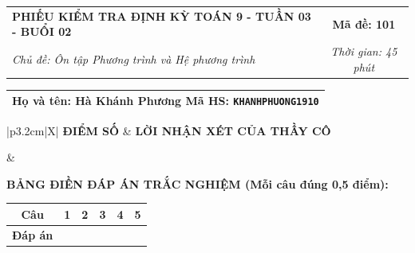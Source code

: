 \documentclass[12pt,a4paper]{article}
\begin{document}
\newpage



\noindent
\begin{tabularx}{\linewidth}{|X|c|}
\hline
\textbf{PHIẾU KIỂM TRA ĐỊNH KỲ TOÁN 9 - TUẦN 03 - BUỔI 02} & \textbf{Mã đề: 101} \\
\textit{Chủ đề: Ôn tập Phương trình và Hệ phương trình} & \textit{Thời gian: 45 phút} \\
\hline
\end{tabularx}

\vspace{1mm}

\noindent
\begin{tabularx}{\linewidth}{|X|}
\hline
\rule[-2mm]{0pt}{7.5mm}\textbf{Họ và tên:} \textbf{\large Hà Khánh Phương} \hfill \textbf{Mã HS:} \texttt{KHANHPHUONG1910} \quad \\
\hline
\end{tabularx}

\vspace{1mm}

\noindent
\begin{tabularx}{\linewidth}{|p{3.2cm}|X|}
\hline
\centering\textbf{ĐIỂM SỐ} & \centering\textbf{LỜI NHẬN XÉT CỦA THẦY CÔ} \tabularnewline
\hline
\rule{0pt}{1.3cm} & \tabularnewline
\hline
\end{tabularx}

\vspace{1.2mm}

\noindent\textbf{BẢNG ĐIỀN ĐÁP ÁN TRẮC NGHIỆM (Mỗi câu đúng 0,5 điểm):}
\vspace{0.8mm}

\noindent
\renewcommand{\arraystretch}{1.35}
\begin{tabularx}{\linewidth}{|c|*{5}{>{\centering\arraybackslash}X|}}
\hline
\textbf{Câu} & \textbf{1} & \textbf{2} & \textbf{3} & \textbf{4} & \textbf{5} \\
\hline
\textbf{Đáp án} & & & & & \\
\hline
\end{tabularx}
\renewcommand{\arraystretch}{1.0}

\vspace{1.5mm}
\end{document}
